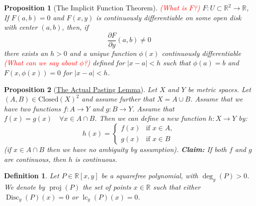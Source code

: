 \documentclass{article}
\def\review#1{\textcolor{red}{(#1)}}
\newtheorem{definition}{Definition}
\newtheorem{proposition}{Proposition}
\begin{document}
\begin{proposition}[The Implicit Function Theorem]
    \review{What is $F$?}
    \(F: U \subset \mathbb{R}^{2} \to \mathbb{R}\),
    If $F(a, b) = 0$ and $F(x, y)$ is continuously differentiable on some open disk with center $(a, b)$, then, if
    $$\frac{\partial F}{\partial y}(a, b) \neq 0$$
    there exists an $h > 0$ and a unique function $\phi(x)$ continuously differentiable \review{What can we say about $\phi$?} defined for $|x - a| < h$ such that $\phi(a) = b$ and $F(x, \phi(x)) = 0$ for $|x - a| < h$.
\end{proposition}

\begin{proposition}[{\href{https://web.math.princeton.edu/~js129/PDFs/teaching/analysis_1_fall_2014/Colloquium_Week_9_Continuity_Pasting_Lemma.pdf}{The Actual Pasting Lemma}}]
    Let $X$ and $Y$ be metric spaces. Let $(A, B) \in \text{Closed}(X)^2$ and assume further that $X = A \cup B$. 
    Assume that we have two functions $f : A \to Y$ and $g : B \to Y$.
    Assume that $f(x) = g(x) \quad \forall x \in A \cap B$.
    Then we can define a new function $h : X \to Y$ by:
    \[
    h(x) = \begin{cases}
        f(x) & \text{if } x \in A, \\
        g(x) & \text{if } x \in B
    \end{cases}
    \]
    (if $x \in A \cap B$ then we have no ambiguity by assumption).
    \textbf{Claim:} If both $f$ and $g$ are continuous, then $h$ is continuous.
\end{proposition}

\begin{definition}
    Let $P\in\mathbb{R}[x,y]$ be a squarefree polynomial, with $\deg_{y}(P) > 0$. We denote by $\operatorname{proj}(P)$ the set of points $x\in\mathbb{R}$ such that either $\operatorname{Disc}_{y}(P)(x)=0$ or $\operatorname{lc}_{y}(P)(x)=0$.
\end{definition}
\end{document}
